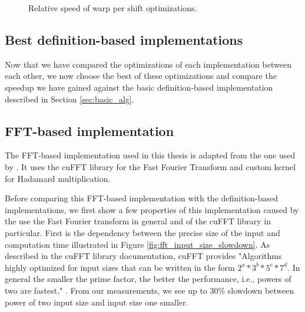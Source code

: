 \begin{figure}[ht]
	\centering
	\def\svgwidth{0.5\textwidth}
	
	\caption{Relative speed of warp per shift optimizations.}
	\label{fig:warp_per_shift_results}
\end{figure}

\subsection{Best definition-based implementations}
\label{sec:results_definition_based}

Now that we have compared the optimizations of each implementation between each other, we now choose the best of these optimizations and compare the speedup we have gained against the basic definition-based implementation described in Section \ref{sec:basic_alg}.

\subsection{FFT-based implementation}

The FFT-based implementation used in this thesis is adapted from the one used by \citet{misko}. It uses the cuFFT library for the Fast Fourier Transform and custom kernel for Hadamard multiplication. 

Before comparing this FFT-based implementation with the definition-based implementations, we first show a few properties of this implementation caused by the use the Fast Fourier transform in general and of the cuFFT library in particular. First is the dependency between the precise size of the input and computation time illustrated in Figure \ref{fig:fft_input_size_slowdown}. As described in the cuFFT library documentation, cuFFT provides "Algorithms highly optimized for input sizes that can be written in the form $2^{a}*3^{b}*5^{c}*7^{d}$. In general the smaller the prime factor, the better the performance, i.e., powers of two are fastest." \citep{site:cufft}. From our measurements, we see up to 30\% %
slowdown between power of two input size and input size one smaller. 




